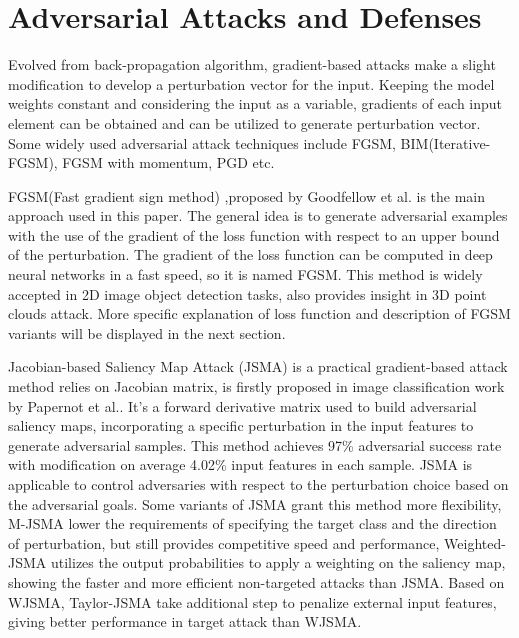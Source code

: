 \section{Adversarial Attacks and Defenses}
Evolved from back-propagation algorithm, gradient-based attacks make a slight modification to develop a perturbation vector for the input. Keeping the model weights constant and considering the input as a variable, gradients of each input element can be obtained and can be utilized to generate perturbation vector. Some widely used adversarial attack techniques include FGSM\cite{goodfellow_explaining_2015}, BIM(Iterative-FGSM\cite{kurakin_adversarial_2017}), FGSM with momentum\cite{dong_boosting_2018}, PGD\cite{madry_towards_2019} etc.

FGSM(Fast gradient sign method) ,proposed by Goodfellow et al.\cite{goodfellow_explaining_2015} is the main approach used in this paper. The general idea is to generate adversarial examples with the use of the gradient of the loss function with respect to an upper bound of the perturbation. The gradient of the loss function can be computed in deep neural networks in a fast speed, so it is named FGSM. This method is widely accepted in 2D image object detection tasks\cite{liu_detection_2018,kurakin_adversarial_2017}, also provides insight in 3D point clouds attack\cite{zeng_adversarial_2019}. More specific explanation of loss function and description of FGSM variants will be displayed in the next section.

Jacobian-based Saliency Map Attack (JSMA) is a practical gradient-based attack method relies on Jacobian matrix, is firstly proposed in image classification work by Papernot et al.\cite{papernot_limitations_2015}. It’s a forward derivative matrix used to build adversarial saliency maps, incorporating a specific perturbation in the input features to generate adversarial samples. This method achieves 97\% adversarial success rate with modification on average 4.02\% input features in each sample. JSMA is applicable to control adversaries with respect to the perturbation choice based on the adversarial goals. Some variants of JSMA grant this method more flexibility, M-JSMA lower the requirements of specifying the target class and the direction of perturbation, but still provides competitive speed and performance\cite{wiyatno_maximal_2018}, Weighted-JSMA utilizes the output probabilities to apply a weighting on the saliency map, showing the faster and more efficient non-targeted attacks than JSMA. Based on WJSMA, Taylor-JSMA take additional step to penalize external input features, giving better performance in target attack than WJSMA\cite{wiyatno_maximal_2018}.

